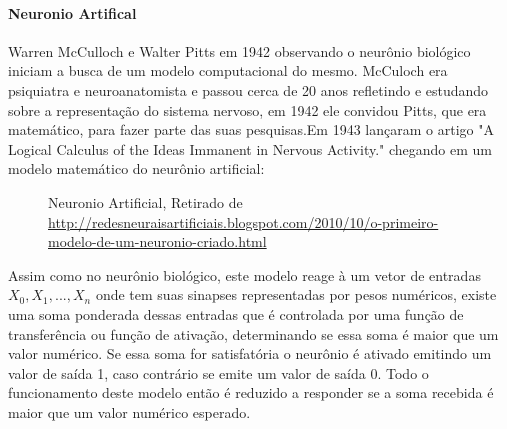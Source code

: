 \documentclass[	12pt, Times, openright, twoside, a4paper, english, brazil]{abntex2}
\begin{document}
          \paragraph*{Neuronio Artifical}
            Warren McCulloch e Walter Pitts em 1942 observando o neurônio biológico iniciam a busca de um modelo computacional do mesmo. McCuloch era psiquiatra e neuroanatomista e passou cerca de 20 anos refletindo e estudando sobre a representação do sistema nervoso, em 1942 ele convidou Pitts, que era matemático, para fazer parte das suas pesquisas.Em 1943 lançaram o artigo "A Logical Calculus of the Ideas Immanent in Nervous Activity." chegando em um modelo matemático do neurônio artificial: 

            \begin{figure}[!ht]
                \caption{Neuronio Artificial, Retirado de \url{http://redesneuraisartificiais.blogspot.com/2010/10/o-primeiro-modelo-de-um-neuronio-criado.html}\label{fig:NeuronioArtificial}}
            \end{figure}

            Assim como no neurônio biológico, este modelo reage à um vetor de entradas $X_0,X_1,...,X_n$ onde tem suas sinapses representadas por pesos numéricos, existe uma soma ponderada dessas entradas que é controlada por uma função de transferência ou função de ativação, determinando se essa soma é maior que um valor numérico. Se essa soma for satisfatória o neurônio é ativado emitindo um valor de saída 1, caso contrário se emite um valor de saída 0.
            Todo o funcionamento deste modelo então é reduzido a responder se a soma recebida é maior que um valor numérico esperado.
\end{document}
